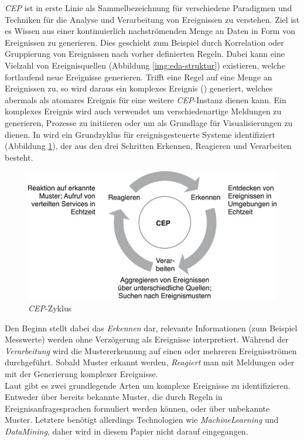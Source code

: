 \documentclass{acm_proc_article-sp}
\begin{document}
\textit{CEP} ist in erste Linie als Sammelbezeichnung für verschiedene Paradigmen und 
Techniken für die Analyse und Verarbeitung von Ereignissen zu verstehen. Ziel ist es 
Wissen aus einer kontinuierlich nachströmenden Menge an Daten in Form von Ereignissen zu 
generieren. Dies geschieht zum Beispiel durch Korrelation oder Gruppierung von 
Ereignissen nach vorher definierten Regeln. Dabei kann eine Vielzahl von 
Ereignisquellen (Abbildung \ref{img:eda-struktur}) existieren, welche fortlaufend neue 
Ereignisse generieren. Trifft eine Regel auf eine Menge an Ereignissen zu, so wird daraus 
ein komplexes Ereignis (\cite{glossary}) generiert, welches abermals als atomares 
Ereignis für eine weitere 
\textit{CEP}-Instanz dienen kann. Ein komplexes Ereignis wird auch verwendet
um verschiedenartige Meldungen zu generieren, Prozesse zu initiieren oder um als 
Grundlage 
für Visualisierungen zu dienen. In \cite{bruns} wird ein Grundzyklus für 
ereignisgesteuerte Systeme identifiziert (Abbildung \ref{img:cep-zyklus}), der aus den 
drei Schritten Erkennen, Reagieren und Verarbeiten besteht.

\begin{figure}[H]
    \centering
    \includegraphics[width=\linewidth]{img/cep-zyklus-bruns.jpg}
    \caption{\textit{CEP}-Zyklus}
    \label{img:cep-zyklus}
\end{figure}

Den Beginn stellt dabei das \emph{Erkennen} dar, relevante Informationen (zum Beispiel 
Messwerte) werden ohne Verzögerung als Ereignisse interpretiert. Während der 
\emph{Verarbeitung} wird die Mustererkennung auf einen oder mehreren Ereignisströmen 
durchgeführt. Sobald Muster erkannt werden, \emph{Reagiert} man mit Meldungen oder mit 
der Generierung komplexer Ereignisse.\\
Laut \cite{eckert} gibt es zwei grundlegende Arten um 
komplexe Ereignisse zu identifizieren. Entweder über bereits bekannte Muster, die durch 
Regeln in Ereignisanfragesprachen formuliert werden können, oder über unbekannte Muster. 
Letztere benötigt allerdings Technologien wie \textit{MachineLearning} und 
\textit{DataMining}, daher wird in diesem Papier nicht darauf eingegangen.
\end{document}

